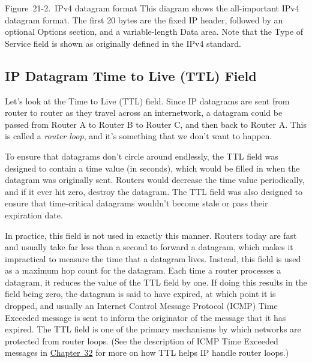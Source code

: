 \documentclass[b5paper,11pt]{memoir}
\begin{document}
\protect\hypertarget{ch21s02.htmlux5cux23ipv4_datagram_format_this_diagram_shows_}{}{}

\protect\hypertarget{ch21s02.htmlux5cux23I_mediaobject7_d1e23159}{}{}

Figure~21-2.~IPv4 datagram format This diagram shows the all-important
IPv4 datagram format. The first 20 bytes are the fixed IP header,
followed by an optional Options section, and a variable-length Data
area. Note that the Type of Service field is shown as originally defined
in the IPv4 standard.

\subsection[IP Datagram Time to Live (TTL)
Field]{\texorpdfstring{\protect\hypertarget{ch21s02.htmlux5cux23ip_datagram_time_to_live_ttl_field}{}{}IP
Datagram Time to Live (TTL)
Field}{IP Datagram Time to Live (TTL) Field}}

Let's look at the
\protect\hypertarget{ch21s02.htmlux5cux23idx-CHP-21-0779}{}{}Time to
Live (TTL) field. Since IP datagrams are sent from router to router as
they travel across an internetwork, a datagram could be passed from
Router A to Router B to Router C, and then back to Router A. This is
called a {\emph{router loop}}, and it's something that we don't want to
happen.

To ensure that datagrams don't circle around endlessly, the TTL
\protect\hypertarget{ch21s02.htmlux5cux23idx-CHP-21-0780}{}{}field was
designed to contain a time value (in seconds), which would be filled in
when the datagram was originally sent. Routers would decrease the time
value periodically, and if it ever hit zero, destroy the datagram. The
TTL \protect\hypertarget{ch21s02.htmlux5cux23idx-CHP-21-0781}{}{}field
was also designed to ensure that time-critical datagrams wouldn't become
stale or pass their expiration date.

In practice, this field is not used in exactly this manner. Routers
today are fast and usually take far less than a second to forward a
datagram, which makes it impractical to measure the time that a datagram
lives. Instead, this field is used as a maximum hop count for the
datagram. Each time a router processes a datagram, it reduces the value
of the TTL field by one. If doing this results in the field being zero,
the datagram is said to have expired, at which point it is dropped, and
usually an Internet Control Message Protocol (ICMP) Time Exceeded
message is sent to inform the originator of the message that it has
expired. The TTL field is one of the primary mechanisms by which
networks are protected from
\protect\hypertarget{ch21s02.htmlux5cux23idx-CHP-21-0782}{}{}router
loops. (See the description of ICMP Time Exceeded messages in
\protect\hyperlink{ch32.html}{Chapter~32} for more on how TTL helps IP
handle router
\protect\hypertarget{ch21s02.htmlux5cux23idx-CHP-21-0783}{}{}loops.)
\end{document}
